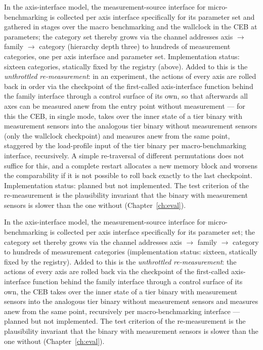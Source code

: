 \begin{nurlang}
In the axis-interface model, the measurement-source interface for micro-benchmarking is collected per
axis interface specifically for its parameter set and gathered in stages over the macro benchmarking
and the wallclock in the CEB at parameters; the category set thereby grows via the channel addresses
axis $\to$ family $\to$ category (hierarchy depth three) to hundreds of measurement categories, one per
axis interface and parameter set. Implementation status: sixteen categories, statically fixed by the
registry (above). Added to this is the \emph{unthrottled re-measurement}: in an experiment, the
actions of every axis are rolled back in order via the checkpoint of the first-called axis-interface
function behind the family interface through a control surface of its own, so that afterwards all axes
can be measured anew from the entry point without measurement --- for this the CEB, in single mode,
takes over the inner state of a tier binary with measurement sensors into the analogous tier binary
without measurement sensors (only the wallclock checkpoint) and measures anew from the same point,
staggered by the load-profile input of the tier binary per macro-benchmarking interface, recursively.
A simple re-traversal of different permutations does not suffice for this, and a complete restart
allocates a new memory block and worsens the comparability if it is not possible to roll back exactly
to the last checkpoint. Implementation status: planned but not implemented. The test criterion of the
re-measurement is the plausibility invariant that the binary with measurement sensors is slower than
the one without (Chapter~\ref{ch:eval}).
\end{nurlang}
\begin{nurkurz}
In the axis-interface model, the measurement-source interface for micro-benchmarking is collected per
axis interface specifically for its parameter set; the category set thereby grows via the channel
addresses axis $\to$ family $\to$ category to hundreds of measurement categories (implementation status:
sixteen, statically fixed by the registry). Added to this is the \emph{unthrottled re-measurement}: the
actions of every axis are rolled back via the checkpoint of the first-called axis-interface function
behind the family interface through a control surface of its own, the CEB takes over the inner state of
a tier binary with measurement sensors into the analogous tier binary without measurement sensors and
measures anew from the same point, recursively per macro-benchmarking interface --- planned but not
implemented. The test criterion of the re-measurement is the plausibility invariant that the binary
with measurement sensors is slower than the one without (Chapter~\ref{ch:eval}).
\end{nurkurz}

